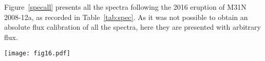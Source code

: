 \documentclass[twocolumn,tighten]{aastex6}
\def\novak{{M31N\,2008-12a}}
\begin{document}
Figure~\ref{specall} presents all the spectra following the 2016 eruption of \novak, as recorded in Table~\ref{tab:spec}.  As it was not possible to obtain an absolute flux calibration of all the spectra, here they are presented with arbitrary flux.

\begin{figure*}[h]
\begin{center}
\texttt{[image: fig16.pdf]}
\caption{All spectra of the 2016 eruption of \novak. The figure shows the spectra in date order (see Table~\ref{tab:spec}) from the 0.54\,d ALFOSC/NOT spectrum at the top to the 5.83\,d DIS/ARC spectrum at the bottom. The wavelengths of prominent lines are indicated.\label{specall}}
\end{center}
\end{figure*}
\end{document}
